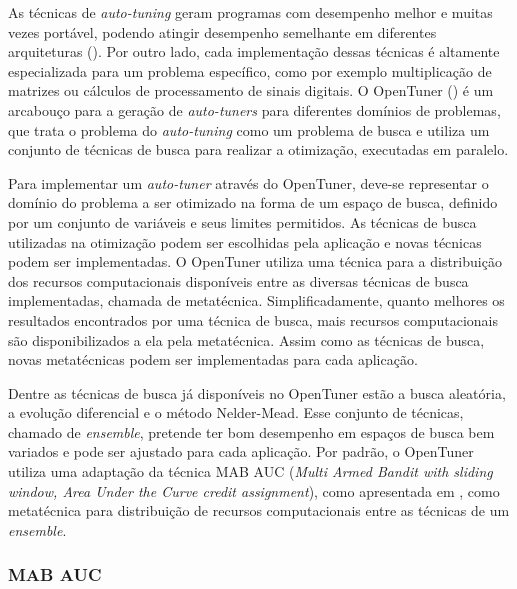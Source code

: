 \documentclass[a4paper, 12pt]{article}
\begin{document}
As técnicas de \emph{auto-tuning} geram programas com desempenho melhor e
muitas vezes portável, podendo atingir desempenho semelhante em diferentes
arquiteturas (\citet{demmel2009accelerating}). Por outro lado, cada
implementação dessas técnicas é altamente especializada para um problema
específico, como por exemplo multiplicação de matrizes ou cálculos de
processamento de sinais digitais.
O OpenTuner (\citet{ansel2013opentuner}) é um arcabouço para a geração de
\emph{auto-tuners} para diferentes domínios de problemas, que trata o problema
do \emph{auto-tuning} como um problema de busca e utiliza um conjunto de
técnicas de busca para realizar a otimização, executadas em paralelo.

Para implementar um \emph{auto-tuner} através do OpenTuner, deve-se representar
o domínio do problema a ser otimizado na forma de um espaço de busca, definido
por um conjunto de variáveis e seus limites permitidos. As técnicas de busca
utilizadas na otimização podem ser escolhidas pela aplicação e novas técnicas
podem ser implementadas. O OpenTuner utiliza uma técnica para a
distribuição dos recursos computacionais disponíveis entre as
diversas técnicas de busca implementadas, chamada de metatécnica.
Simplificadamente, quanto melhores os resultados encontrados por uma técnica de
busca, mais recursos computacionais são disponibilizados a ela pela
metatécnica. Assim como as técnicas de busca, novas metatécnicas podem ser
implementadas para cada aplicação.

Dentre as técnicas de busca já disponíveis no OpenTuner estão a busca
aleatória, a evolução diferencial e o método Nelder-Mead. Esse conjunto
de técnicas, chamado de \emph{ensemble}, pretende ter bom desempenho em espaços
de busca bem variados e pode ser ajustado para cada aplicação. Por padrão, o
OpenTuner utiliza uma adaptação da técnica MAB AUC (\emph{Multi Armed Bandit
with sliding window, Area Under the Curve credit assignment}), como apresentada
em \citet{pacula2012bandit}, como metatécnica para distribuição de recursos
computacionais entre as técnicas de um \emph{ensemble}.

\subsubsection{MAB AUC}
\end{document}
